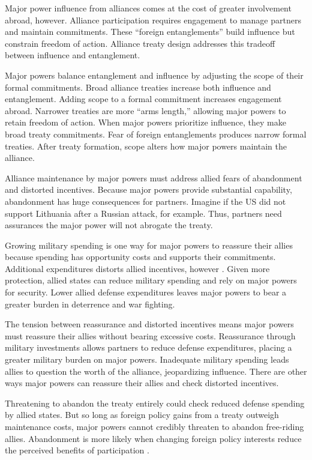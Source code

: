 \documentclass[12pt]{article}
\begin{document}
Major power influence from alliances comes at the cost of greater involvement abroad, however.
Alliance participation requires engagement to manage partners and maintain commitments.
These ``foreign entanglements'' build influence but constrain freedom of action.
Alliance treaty design addresses this tradeoff between influence and entanglement. 


Major powers balance entanglement and influence by adjusting the scope of their formal commitments. 
Broad alliance treaties increase both influence and entanglement. 
Adding scope to a formal commitment increases engagement abroad. 
Narrower treaties are more ``arms length,'' allowing major powers to retain freedom of action. 
When major powers prioritize influence, they make broad treaty commitments.
Fear of foreign entanglements produces narrow formal treaties. 
After treaty formation, scope alters how major powers maintain the alliance. 


Alliance maintenance by major powers must address allied fears of abandonment and distorted incentives. 
Because major powers provide substantial capability, abandonment has huge consequences for partners. 
Imagine if the US did not support Lithuania after a Russian attack, for example. 
Thus, partners need assurances the major power will not abrogate the treaty. 


Growing military spending is one way for major powers to reassure their allies because spending has opportunity costs and supports their commitments. 
Additional expenditures distorts allied incentives, however \citep{Lake1996, Lake2009}. 
Given more protection, allied states can reduce military spending and rely on major powers for security.
Lower allied defense expenditures leaves major powers to bear a greater burden in deterrence and war fighting. 


The tension between reassurance and distorted incentives means major powers must reassure their allies without bearing excessive costs.
Reassurance through military investments allows partners to reduce defense expenditures, placing a greater military burden on major powers. 
Inadequate military spending leads allies to question the worth of the alliance, jeopardizing influence.   
There are other ways major powers can reassure their allies and check distorted incentives. 


Threatening to abandon the treaty entirely could check reduced defense spending by allied states. 
But so long as foreign policy gains from a treaty outweigh maintenance costs, major powers cannot credibly threaten to abandon free-riding allies. 
Abandonment is more likely when changing foreign policy interests reduce the perceived benefits of participation \citep{LeedsSavun2007}.
\end{document}

